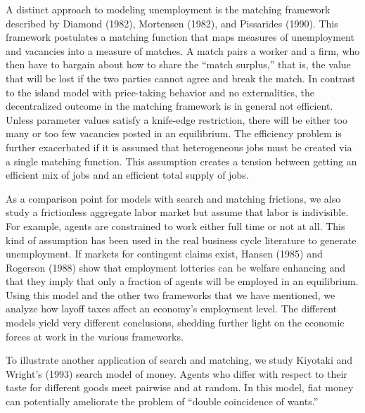 A distinct  approach to modeling unemployment is the matching framework
%
described by Diamond (1982), Mortensen (1982), and Pissarides (1990).
%
This framework  postulates  a matching function that
maps measures of unemployment and vacancies into a measure of matches. A match
pairs a worker and a firm, who then have to bargain about how to share the
``match surplus,''
%
that is, the value that will be lost if the two parties cannot agree and
break the match. In contrast to the island model with price-taking behavior
and no externalities, the decentralized outcome in the matching framework is
in general not efficient. Unless parameter values satisfy a knife-edge
restriction, there will be either  too many or too few vacancies posted
in an equilibrium.  The efficiency problem is further exacerbated if it is
assumed that heterogeneous jobs must be created via a single matching function.
This assumption creates a tension between getting an efficient mix of jobs and
an efficient total supply of jobs.

As a comparison point for  models with search and matching frictions, we also study a
frictionless aggregate labor market but assume that labor is indivisible.  For
example, agents are constrained to work either full time or not at all.  This
kind of assumption has been used in the real business cycle literature to generate
unemployment. If markets for contingent claims exist,
Hansen (1985) and Rogerson (1988)
show that employment lotteries
%
can be welfare enhancing and that they imply that only a fraction  of agents will
be employed in an equilibrium. Using this model and the other two frameworks
that we have mentioned, we analyze how layoff taxes affect an economy's employment
level. The different models yield very different conclusions, shedding further
light on the economic forces at work in the various frameworks.



To illustrate another application of search and matching, we study Kiyotaki and
Wright's (1993) search model of money.
Agents who differ with respect to their taste for different goods meet pairwise
and at random. In this model, fiat money can potentially ameliorate the problem
of ``double coincidence of wants.''

